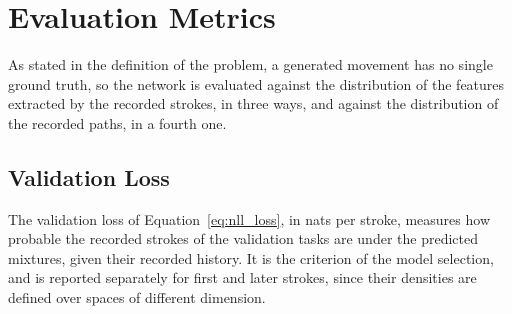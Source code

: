 \documentclass[12pt]{report}
\begin{document}
\section{Evaluation Metrics}
\label{sec:evaluation_metrics}
As stated in the definition of the problem, a generated movement has no single ground truth, so the network is evaluated against the distribution of the features extracted by the recorded strokes, in three ways, and against the distribution of the recorded paths, in a fourth one.

\subsection{Validation Loss}
\label{sec:validation_loss}
The validation loss of Equation~\eqref{eq:nll_loss}, in nats per stroke, measures how probable the recorded strokes of the validation tasks are under the predicted mixtures, given their recorded history. It is the criterion of the model selection, and is reported separately for first and later strokes, since their densities are defined over spaces of different dimension.
\end{document}
